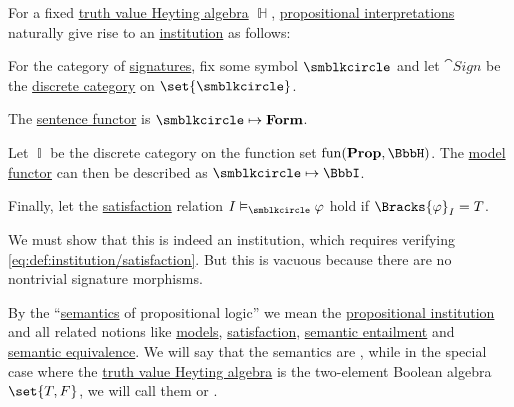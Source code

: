 \begin{definition}\label{def:propositional_institution}\mimprovised
  For a fixed \hyperref[def:truth_value_algebra]{truth value Heyting algebra} \( \BbbH \), \hyperref[def:propositional_valuation/interpretation]{propositional interpretations} naturally give rise to an \hyperref[def:institution]{institution} as follows:
  \begin{thmenum}
     For the category of \hyperref[def:institution/signatures]{signatures}, fix some symbol \( \anon \) and let \( \cat{Sign} \) be the \hyperref[def:discrete_category]{discrete category} on \( \set{ \anon } \).

     The \hyperref[def:institution/sentences]{sentence functor} is \( \anon \mapsto \op*{Form} \).

     Let \( \BbbI \) be the discrete category on the function set \( \fun(\op*{Prop}, \BbbH) \). The \hyperref[def:institution/models]{model functor} can then be described as \( \anon \mapsto \BbbI \).

     Finally, let the \hyperref[def:institution/satisfaction]{satisfaction} relation \( I \vDash_{\anon} \varphi \) hold if \( \Bracks{\varphi}_I = T \).
  \end{thmenum}
\end{definition}
\begin{defproof}
  We must show that this is indeed an institution, which requires verifying \eqref{eq:def:institution/satisfaction}. But this is vacuous because there are no nontrivial signature morphisms.
\end{defproof}

\begin{definition}\label{def:propositional_semantics}\mimprovised
  By the \enquote{\hyperref[con:syntax_and_semantics]{semantics} of propositional logic} we mean the \hyperref[def:propositional_institution]{propositional institution} and all related notions like \hyperref[def:institution/models]{models}, \hyperref[def:institution/satisfaction]{satisfaction}, \hyperref[def:institutional_entailment]{semantic entailment} and \hyperref[def:semantic_equivalence]{semantic equivalence}. We will say that the semantics are , while in the special case where the \hyperref[def:truth_value_algebra]{truth value Heyting algebra} is the two-element Boolean algebra \( \set{ T, F } \), we will call them  or .
\end{definition}

